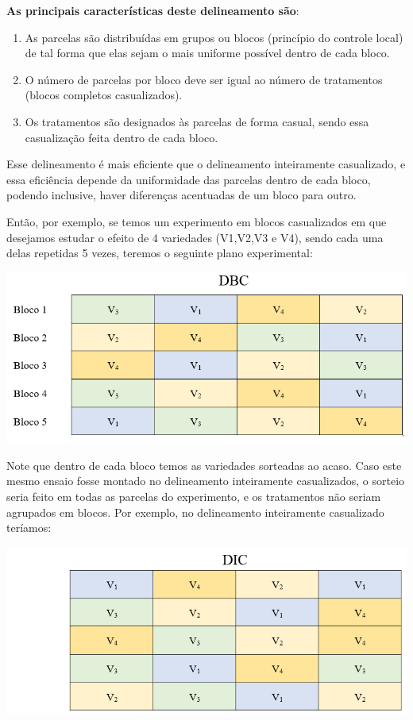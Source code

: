 \documentclass[
]{book}
\begin{document}
\textbf{As principais características deste delineamento são}:

\begin{enumerate}
\def\labelenumi{\arabic{enumi}.}
\item
  As parcelas são distribuídas em grupos ou blocos (princípio do controle local) de tal forma que elas sejam o mais uniforme possível dentro de cada bloco.
\item
  O número de parcelas por bloco deve ser igual ao número de tratamentos (blocos completos casualizados).
\item
  Os tratamentos são designados às parcelas de forma casual, sendo essa casualização feita dentro de cada bloco.
\end{enumerate}

Esse delineamento é mais eficiente que o delineamento inteiramente casualizado, e essa eficiência depende da uniformidade das parcelas dentro de cada bloco, podendo inclusive, haver diferenças acentuadas de um bloco para outro.

Então, por exemplo, se temos um experimento em blocos casualizados em que desejamos estudar o efeito de 4 variedades (V1,V2,V3 e V4), sendo cada uma delas repetidas 5 vezes, teremos o seguinte plano experimental:

\includegraphics{DBC_d.png}

Note que dentro de cada bloco temos as variedades sorteadas ao acaso. Caso este mesmo ensaio fosse montado no delineamento inteiramente casualizados, o sorteio seria feito em todas as parcelas do experimento, e os tratamentos não seriam agrupados em blocos. Por exemplo, no delineamento inteiramente casualizado teríamos:

\includegraphics{DIC_d.png}
\end{document}
